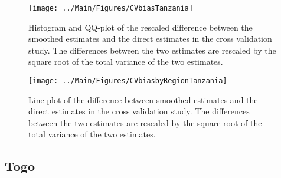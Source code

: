 \documentclass[12pt]{article}\usepackage[]{graphicx}\usepackage[]{color}
\newenvironment{knitrout}{}{} %
\begin{document}
\begin{knitrout}
\color{fgcolor}\begin{figure}[bht]

{\centering \texttt{[image: ../Main/Figures/CVbiasTanzania]} 

}

\caption[Histogram and QQ-plot of the rescaled difference between the smoothed estimates and the direct estimates in the cross validation study]{Histogram and QQ-plot of the rescaled difference between the smoothed estimates and the direct estimates in the cross validation study. The differences between the two estimates are rescaled by the square root of the total variance of the two estimates.}\label{fig:unnamed-chunk-309}
\end{figure}


\end{knitrout}

\begin{knitrout}
\color{fgcolor}\begin{figure}[bht]

{\centering \texttt{[image: ../Main/Figures/CVbiasbyRegionTanzania]} 

}

\caption[Line plot of the difference between smoothed estimates and the direct estimates in the cross validation study]{Line plot of the difference between smoothed estimates and the direct estimates in the cross validation study. The differences between the two estimates are rescaled by the square root of the total variance of the two estimates.}\label{fig:unnamed-chunk-310}
\end{figure}


\end{knitrout}


\clearpage
\subsection{Togo}


\end{document}
